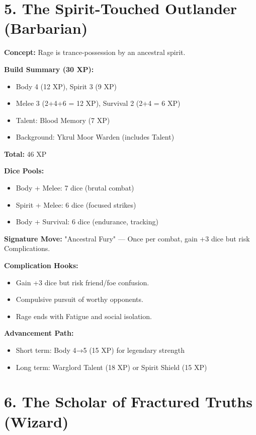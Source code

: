 \section{5. The Spirit-Touched Outlander (Barbarian)}

\textbf{Concept:} Rage is trance-possession by an ancestral spirit.

\textbf{Build Summary (30 XP):}
\begin{itemize}
  \item Body 4 (12 XP), Spirit 3 (9 XP)
  \item Melee 3 (2+4+6 = 12 XP), Survival 2 (2+4 = 6 XP)
  \item Talent: Blood Memory (7 XP)
  \item Background: Ykrul Moor Warden (includes Talent)
\end{itemize}
\textbf{Total:} 46 XP

\textbf{Dice Pools:}
\begin{itemize}
  \item Body + Melee: 7 dice (brutal combat)
  \item Spirit + Melee: 6 dice (focused strikes)
  \item Body + Survival: 6 dice (endurance, tracking)
\end{itemize}

\textbf{Signature Move:} "Ancestral Fury" — Once per combat, gain +3 dice but risk Complications.

\textbf{Complication Hooks:}
\begin{itemize}
  \item Gain +3 dice but risk friend/foe confusion.
  \item Compulsive pursuit of worthy opponents.
  \item Rage ends with Fatigue and social isolation.
\end{itemize}

\textbf{Advancement Path:}
\begin{itemize}
  \item Short term: Body 4→5 (15 XP) for legendary strength
  \item Long term: Warglord Talent (18 XP) or Spirit Shield (15 XP)
\end{itemize}

\section{6. The Scholar of Fractured Truths (Wizard)}

